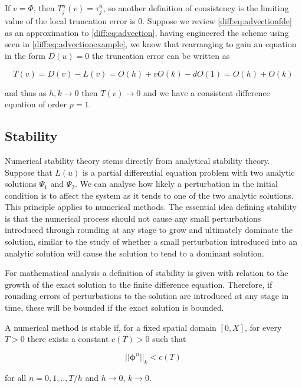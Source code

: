 \documentclass[../main.tex]{subfiles}
\begin{document}
  If $v = \Phi$, then $T^n_j(v) = \tau^n_j$, so another definition of consistency is the limiting value of the local truncation error is $0$. Suppose we review \autoref{diff:eq:advectionfde} as an approximation to \autoref{diff:eq:advection}, having engineered the scheme using \cite{fornberg1988} seen in \autoref{diff:eq:advectionexample}, we know that rearranging to gain an equation in the form $D(u) = 0$ the truncation error can be written as

  \begin{equation}
    T(v) = D(v) - L(v) = O(h) + v O(k) - d O(1) = O(h) + O(k)
  \end{equation}

  and thus as $h, k \to 0$ then $T(v) \to 0$ and we have a consistent difference equation of order $p = 1$.

  \subsection{Stability}
  Numerical stability theory stems directly from analytical stability theory. Suppose that $L(u)$ is a partial differential equation problem with two analytic solutions $\Psi_1$ and $\Psi_2$. We can analyse how likely a perturbation in the initial condition is to affect the system as it tends to one of the two analytic solutions. This principle applies to numerical methods. The essential idea defining stability is that the numerical process should not cause any small perturbations introduced through rounding at any stage to grow and ultimately dominate the solution, similar to the study of whether a small perturbation introduced into an analytic solution will cause the solution to tend to a dominant solution.

  For mathematical analysis a definition of stability is given with relation to the growth of the exact solution to the finite difference equation. Therefore, if rounding errors of perturbations to the solution are introduced at any stage in time, these will be bounded if the exact solution is bounded.

  \begin{definition}
    A numerical method is stable if, for a fixed spatial domain $[0, X]$, for every $T > 0$ there exists a constant $c(T) > 0$ such that

    \begin{equation}
      || \boldsymbol\phi^n ||_k < c(T)
    \end{equation}

    for all $n = 0, 1, .. , T / h$ and $h \to 0$, $k \to 0$.
  \end{definition}
\end{document}
